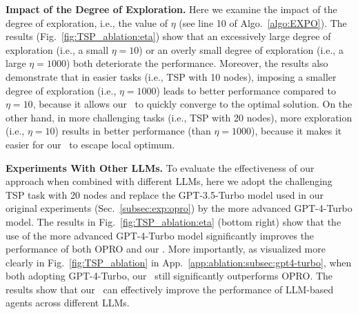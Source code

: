 \textbf{Impact of the Degree of Exploration.}
Here we examine the impact of the degree of exploration, i.e., the value of $\eta$ (see line 10 of Algo.~\ref{algo:EXPO}).
The results (Fig.~\ref{fig:TSP_ablation:eta}) show that an excessively large degree of exploration (i.e., a small $\eta=10$) or an overly small degree of exploration (i.e., a large $\eta=1000$) both deteriorate the performance.
Moreover, the results also demonstrate that in easier tasks (i.e., TSP with 10 nodes), imposing a smaller degree of exploration (i.e., $\eta=1000$) leads to better performance compared to $\eta=10$, because it allows our \alg~to quickly converge to the optimal solution. On the other hand, in more challenging tasks (i.e., TSP with 20 nodes), more exploration (i.e., $\eta=10$) results in better performance (than $\eta=1000$), because it makes it easier for our \alg~to escape local optimum.




\textbf{Experiments With Other LLMs.}
To evaluate the effectiveness of our approach when combined with different LLMs, here we adopt the challenging TSP task with 20 nodes and replace the GPT-3.5-Turbo model used in our original experiments (Sec.~\ref{subsec:exp:opro}) by the more advanced GPT-4-Turbo model.
The results in Fig.~\ref{fig:TSP_ablation:eta} (bottom right) show that the use of the more advanced GPT-4-Turbo model significantly improves the performance of both OPRO and our \alg.
More importantly, as visualized more clearly in Fig.~\ref{fig:TSP_ablation} in App.~\ref{app:ablation:subsec:gpt4-turbo}, when both adopting GPT-4-Turbo, our \alg~still significantly outperforms OPRO.
The results show that our \alg~can effectively improve the performance of LLM-based agents across different LLMs.

